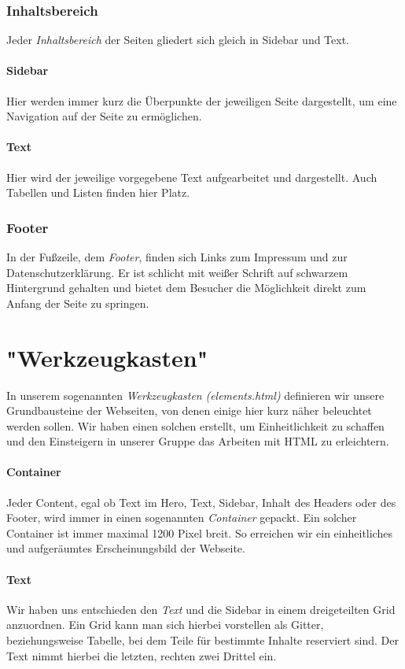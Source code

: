 \documentclass[12pt,a4paper]{article}
\begin{document}
\subsubsection{Inhaltsbereich}
Jeder \textit{Inhaltsbereich} der Seiten gliedert sich gleich in
Sidebar und Text.
\paragraph{Sidebar}
Hier werden immer kurz die Überpunkte der jeweiligen Seite dargestellt, um eine Navigation auf der Seite zu ermöglichen.
\paragraph{Text}
Hier wird der jeweilige vorgegebene Text aufgearbeitet und dargestellt. Auch Tabellen und Listen finden hier Platz.
\subsubsection{Footer}
In der Fußzeile, dem \textit{Footer}, finden sich Links zum Impressum und zur Datenschutzerklärung. Er ist schlicht mit weißer Schrift auf schwarzem Hintergrund gehalten und bietet dem Besucher die Möglichkeit direkt zum Anfang der Seite zu springen.
\section{"Werkzeugkasten"}
In unserem sogenannten \textit{Werkzeugkasten} \emph{(elements.html)} definieren wir unsere Grundbausteine der Webseiten, von denen einige hier kurz näher beleuchtet werden sollen. Wir haben einen solchen erstellt, um Einheitlichkeit zu schaffen und den Einsteigern in unserer Gruppe das Arbeiten mit HTML zu erleichtern.
\paragraph{Container}
Jeder Content, egal ob Text im Hero, Text, Sidebar, Inhalt des Headers oder des Footer, wird immer in einen sogenannten \textit{Container} gepackt.
Ein solcher Container ist immer maximal 1200 Pixel breit. So erreichen wir ein einheitliches und aufgeräumtes Erscheinungsbild der Webseite.
\paragraph{Text}
Wir haben uns entschieden den \textit{Text} und die Sidebar in einem dreigeteilten Grid  anzuordnen. Ein Grid kann man sich hierbei vorstellen als Gitter, beziehungsweise Tabelle, bei dem Teile für bestimmte Inhalte reserviert sind. Der Text nimmt hierbei die letzten, rechten zwei Drittel ein.
\end{document}
